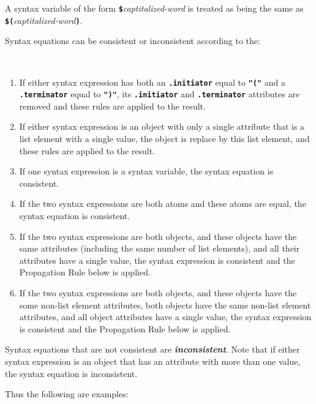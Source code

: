 \documentclass[12pt]{article}
\newcommand{\TT}[1]{{\tt \bfseries #1}}
\newcommand{\key}[1]{{\bf \em #1}\index{#1}}
\newcommand{\ikey}[2]{{\bf \em #1}\index{#2}}
\newenvironment{indpar}[1][0.3in]%
	{\begin{list}{}%
		     {\setlength{\itemsep}{0in}%
		      \setlength{\topsep}{0in}%
		      \setlength{\parsep}{1ex}%
		      \setlength{\labelwidth}{#1}%
		      \setlength{\leftmargin}{#1}%
		      \addtolength{\leftmargin}{\labelsep}}%
	 \item}%
	{\end{list}}
\begin{document}
A syntax variable of the form \TT{\$}{\em captitalized-word}
is treated as being the same as
\TT{\$(}{\em captitalized-word}\TT{)}.

Syntax equations can be consistent or inconsistent according to the:

\begin{indpar}
\begin{list}{}{}
\item[\ikey{Syntax Equation Consistency Rules}%
           {consistency rules!syntax equation}%
	   \label{SYNTAX-EQUATION-CONSISTENCY-RULES}:]~

\begin{enumerate}
\item If either syntax expression has both an \TT{.initiator} equal to \TT{"("}
and a \TT{.ter\-min\-a\-tor} equal to \TT{")"}, its \TT{.initiator} and
\TT{.terminator} attributes are removed and these rules are applied to the
result.
\item If either syntax expression is an object with only a single attribute
that is a list element with a single value,
the object is replace by this list element,
and these rules are applied to the
result.
\item If one syntax expression is a syntax variable, the syntax equation
is consistent.
\item If the two syntax expressions are both atoms and these atoms are
equal, the syntax equation is consistent.
\item If the two syntax expressions are both objects, and these objects
have the same attributes (including the same number of list elements),
and all their attributes have a single value,
the syntax expression is consistent and the Propagation Rule
below is applied.
\item If the two syntax expressions are both objects, and these objects
have the some non-list element attributes, both objects have the same
non-list element attributes, and all object attributes have a single value,
the syntax expression is consistent and the Propagation Rule
below is applied.
\end{enumerate}

Syntax equations that are not consistent are \key{inconsistent}.
Note that if either syntax expression is an object that has an attribute
with more than one value, the syntax equation is inconsistent.
\end{list}
\end{indpar}

Thus the following are examples:
\end{document}
